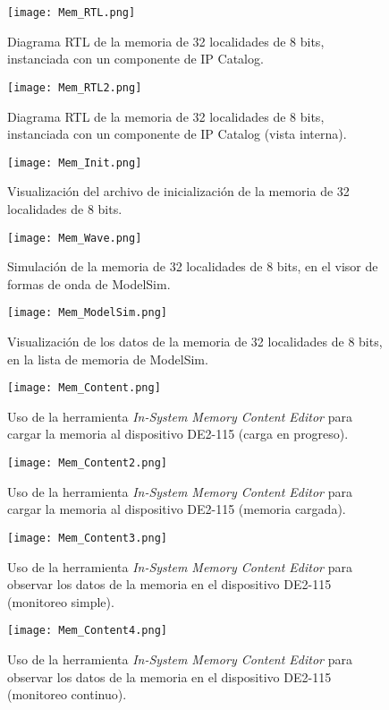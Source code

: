 \begin{figure}[ht]
	\centering
	\texttt{[image: Mem\_RTL.png]}
	\caption{Diagrama RTL de la memoria de 32 localidades de 8 bits, instanciada con un componente de IP Catalog. \label{fig:mem_rtl}}
\end{figure}

\begin{figure}[ht]
	\centering
	\texttt{[image: Mem\_RTL2.png]}
	\caption{Diagrama RTL de la memoria de 32 localidades de 8 bits, instanciada con un componente de IP Catalog (vista interna). \label{fig:mem_rtl2}}
\end{figure}

\begin{figure}[ht]
	\centering
	\texttt{[image: Mem\_Init.png]}
	\caption{Visualización del archivo de inicialización de la memoria de 32 localidades de 8 bits. \label{fig:mem_init}}
\end{figure}

\begin{figure}[ht]
	\centering
	\texttt{[image: Mem\_Wave.png]}
	\caption{Simulación de la memoria de 32 localidades de 8 bits, en el visor de formas de onda de ModelSim. \label{fig:mem_wave}}
\end{figure}

\begin{figure}[ht]
	\centering
	\texttt{[image: Mem\_ModelSim.png]}
	\caption{Visualización de los datos de la memoria de 32 localidades de 8 bits, en la lista de memoria de ModelSim. \label{fig:mem_modelsim}}
\end{figure}

\begin{figure}[ht]
	\centering
	\texttt{[image: Mem\_Content.png]}
	\caption{Uso de la herramienta \textit{In-System Memory Content Editor} para cargar la memoria al dispositivo DE2-115 (carga en progreso). \label{fig:mem_content1}}
\end{figure}

\begin{figure}[ht]
	\centering
	\texttt{[image: Mem\_Content2.png]}
	\caption{Uso de la herramienta \textit{In-System Memory Content Editor} para cargar la memoria al dispositivo DE2-115 (memoria cargada). \label{fig:mem_content2}}
\end{figure}

\begin{figure}[ht]
	\centering
	\texttt{[image: Mem\_Content3.png]}
	\caption{Uso de la herramienta \textit{In-System Memory Content Editor} para observar los datos de la memoria en el dispositivo DE2-115 (monitoreo simple). \label{fig:mem_content3}}
\end{figure}

\begin{figure}[ht]
	\centering
	\texttt{[image: Mem\_Content4.png]}
	\caption{Uso de la herramienta \textit{In-System Memory Content Editor} para observar los datos de la memoria en el dispositivo DE2-115 (monitoreo continuo). \label{fig:mem_content4}}
\end{figure}